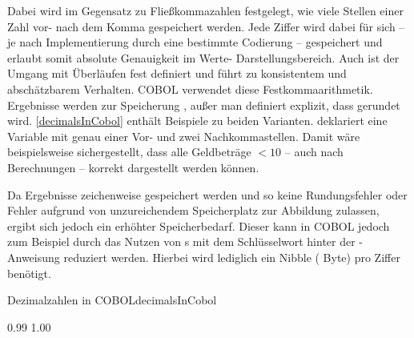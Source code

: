 Dabei wird im Gegensatz zu Fließkommazahlen festgelegt, wie viele Stellen einer Zahl vor- \bzw nach dem Komma gespeichert werden. Jede Ziffer wird dabei für sich -- je nach Implementierung durch eine bestimmte Codierung -- gespeichert und erlaubt somit absolute Genauigkeit im Werte- \bzw Darstellungsbereich. Auch ist der Umgang mit Überläufen fest definiert und führt zu konsistentem und abschätzbarem Verhalten. COBOL verwendet diese Festkommaarithmetik. Ergebnisse werden zur Speicherung , außer man definiert explizit, dass gerundet wird. \autoref{decimalsInCobol} enthält Beispiele zu beiden Varianten.  deklariert eine Variable mit genau einer Vor- und zwei Nachkommastellen. Damit wäre beispielsweise sichergestellt, dass alle Geldbeträge $<10$ -- auch nach Berechnungen -- korrekt dargestellt werden können.

Da Ergebnisse zeichenweise gespeichert werden und so keine Rundungsfehler oder Fehler aufgrund von unzureichendem Speicherplatz zur Abbildung zulassen, ergibt sich jedoch ein erhöhter Speicherbedarf. Dieser kann in COBOL jedoch zum Beispiel durch das Nutzen von s mit dem Schlüsselwort  hinter der -Anweisung reduziert werden. Hierbei wird lediglich ein Nibble ( Byte) pro Ziffer benötigt.

\begin{codeWithCaption}{Dezimalzahlen in COBOL}{decimalsInCobol}
    \begin{shellwindow}
    0.99
    1.00
    \end{shellwindow}
\end{codeWithCaption}

